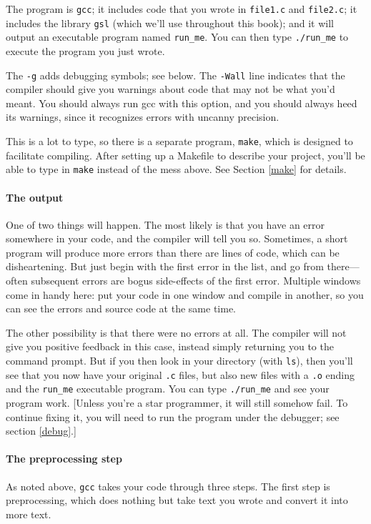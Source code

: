 \documentclass[12pt]{article}
\def\ind#1{\index{#1}#1}
\begin{document}
The program is {\tt gcc}; it includes code that you wrote in {\tt file1.c} and {\tt file2.c}; it
includes the library {\tt gsl} (which we'll use throughout this book); and it will output an executable
program named {\tt run\_me}. You can then type {\tt ./run\_me} to execute the program you just wrote. 

The {\tt -g} adds \ind{debugging} symbols; see below.  The {\tt -Wall} line
indicates that the compiler should give you warnings about code that
may not be what you'd meant. You should always run gcc with this option,
and you should always heed its warnings, since it recognizes errors with
uncanny precision.

This is a lot to type, so there is a separate program, {\tt make},
which is designed to facilitate compiling. After setting up a Makefile
to describe your project, you'll be able to type in {\tt make} instead
of the mess above. See Section \ref{make} for details.

\paragraph{The output} One of two things will happen. The most likely is that you have an error somewhere
in your code, and the compiler will tell you so. Sometimes, a short program will produce more errors than
there are lines of code, which can be disheartening. But just begin with the first error in the list, and
go from there---often subsequent errors are bogus side-effects of the first error. Multiple windows come in handy here:
put your code in one window and compile in another, so you can see the errors and source code at the same time.

The other possibility is that there were no errors at all. The compiler will not give you positive feedback
in this case, instead simply returning you to the command prompt. But if you then look in your directory
(with {\tt ls}), then you'll see that you now have your original {\tt .c}
files, but also new files with a {\tt .o} ending and the {\tt run\_me}
executable program. You can type {\tt ./run\_me} and see your program
work. [Unless you're a star programmer, it will still somehow fail. To
continue fixing it, you will need to run the program under the debugger;
see section \ref{debug}.]

\paragraph{The preprocessing step}
As noted above, {\tt gcc} takes your code through three steps.
The first step is \ind{preprocessing},
which does nothing but take text you wrote and convert it into more text.
\end{document}

